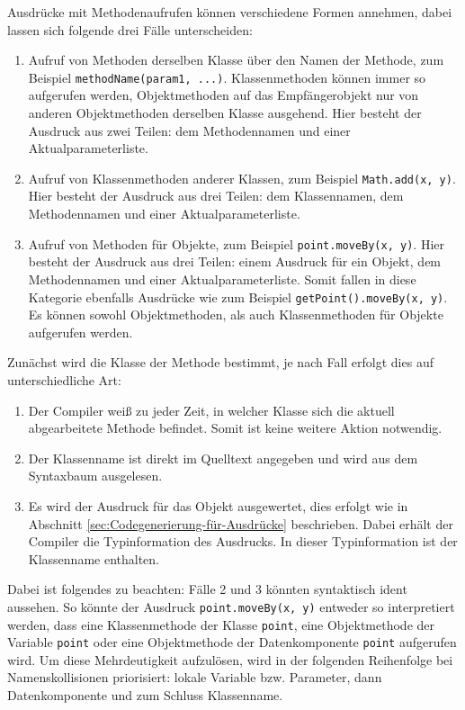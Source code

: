 Ausdrücke mit Methodenaufrufen können verschiedene Formen annehmen, dabei lassen sich folgende drei Fälle unterscheiden:
\begin{enumerate}
    \item Aufruf von Methoden derselben Klasse über den Namen der Methode, zum Beispiel \lstinline{methodName(param1, ...)}. Klassenmethoden können immer so aufgerufen werden, Objektmethoden auf das Empfängerobjekt nur von anderen Objektmethoden derselben Klasse ausgehend. Hier besteht der Ausdruck aus zwei Teilen: dem Methodennamen und einer Aktualparameterliste.
    \item Aufruf von Klassenmethoden anderer Klassen, zum Beispiel \lstinline{Math.add(x, y)}. Hier besteht der Ausdruck aus drei Teilen: dem Klassennamen, dem Methodennamen und einer Aktualparameterliste.
    \item Aufruf von Methoden für Objekte, zum Beispiel \lstinline{point.moveBy(x, y)}. Hier besteht der Ausdruck aus drei Teilen: einem Ausdruck für ein Objekt, dem Methodennamen und einer Aktualparameterliste. Somit fallen in diese Kategorie ebenfalls Ausdrücke wie zum Beispiel \lstinline{getPoint().moveBy(x, y)}. Es können sowohl Objektmethoden, als auch Klassenmethoden für Objekte aufgerufen werden.
\end{enumerate}

Zunächst wird die Klasse der Methode bestimmt, je nach Fall erfolgt dies auf unterschiedliche Art:
\begin{enumerate}
    \item Der Compiler weiß zu jeder Zeit, in welcher Klasse sich die aktuell abgearbeitete Methode befindet. Somit ist keine weitere Aktion notwendig.
    \item Der Klassenname ist direkt im Quelltext angegeben und wird aus dem Syntaxbaum ausgelesen.
    \item Es wird der Ausdruck für das Objekt ausgewertet, dies erfolgt wie in Abschnitt \ref{sec:Codegenerierung-für-Ausdrücke} beschrieben. Dabei erhält der Compiler die Typinformation des Ausdrucks. In dieser Typinformation ist der Klassenname enthalten.
\end{enumerate}

Dabei ist folgendes zu beachten: Fälle 2 und 3 könnten syntaktisch ident aussehen. So könnte der Ausdruck \lstinline{point.moveBy(x, y)} entweder so interpretiert werden, dass eine Klassenmethode der Klasse \lstinline{point}, eine Objektmethode der Variable \lstinline{point} oder eine Objektmethode der Datenkomponente \lstinline{point} aufgerufen wird. Um diese Mehrdeutigkeit aufzulösen, wird in der folgenden Reihenfolge bei Namenskollisionen priorisiert: lokale Variable bzw. Parameter, dann Datenkomponente und zum Schluss Klassenname.

